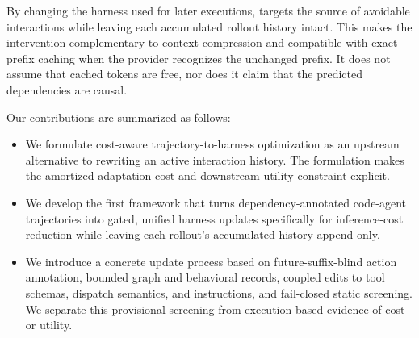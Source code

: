 By changing the harness used for later executions, \sys{} targets the source of avoidable interactions while leaving each accumulated rollout history intact. This makes the intervention complementary to context compression and compatible with exact-prefix caching when the provider recognizes the unchanged prefix. It does not assume that cached tokens are free, nor does it claim that the predicted dependencies are causal.

Our contributions are summarized as follows:

\begin{itemize}[leftmargin=*,itemsep=2pt,topsep=3pt]

\item We formulate cost-aware trajectory-to-harness optimization as an upstream alternative to rewriting an active interaction history. The formulation makes the amortized adaptation cost and downstream utility constraint explicit.

\item We develop the first framework that turns dependency-annotated code-agent trajectories into gated, unified harness updates specifically for inference-cost reduction while leaving each rollout's accumulated history append-only.

\item We introduce a concrete update process based on future-suffix-blind action annotation, bounded graph and behavioral records, coupled edits to tool schemas, dispatch semantics, and instructions, and fail-closed static screening. We separate this provisional screening from execution-based evidence of cost or utility.

\end{itemize}
